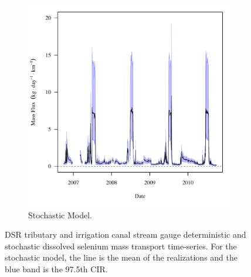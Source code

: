 \begin{landscape}
\begin{figure}
\begin{subfigure}{0.7\textwidth}
			\includegraphics[width=\tableCustomSize]{"Figures/Results_DSR/Stochastic/f D101C"}
			\caption{Stochastic Model.}
		\end{subfigure}
		\caption[DSR tributary and irrigation canal stream gauge deterministic and stochastic dissolved selenium mass transport time-series.]{DSR tributary and irrigation canal stream gauge deterministic and stochastic dissolved selenium mass transport time-series.  For the stochastic model, the line is the mean of the realizations and the blue band is the 97.5th CIR.}
		\label{fig:massTrans_DSR}
	\end{figure}
\end{landscape}
\subfiguremid

